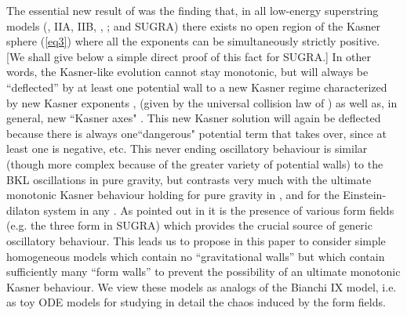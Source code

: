 \documentclass[a4paper,12pt]{article}
\begin{document}
The essential new result of \cite{dh1} was the finding that, in all 
low-energy superstring models (\coordHE{}, IIA, IIB, \coordHE{}, 
\coordHE{}; and \coordHE{} SUGRA) there exists no open region 
of the Kasner sphere (\ref{eq3}) where all the exponents \coordHE{} can be simultaneously strictly positive. 
[We shall give below a simple direct proof of this fact for \coordHE{} 
SUGRA.] In other words, the Kasner-like evolution
cannot stay 
monotonic, but will always be ``deflected'' by at least one 
potential wall to a new Kasner regime characterized by new Kasner
exponents \coordHE{}, \coordHE{} (given by the universal 
collision law of \cite{dh1}) as well as, in general, new
``Kasner axes" \coordHE{}.  This new Kasner solution will
again be deflected because there is always one``dangerous"
potential term that takes over, since at least one \coordHE{} 
is negative, etc.
This never ending oscillatory behaviour is similar (though more 
complex because of the greater variety of potential walls) to the BKL 
oscillations in \coordHE{} pure gravity, but contrasts very much with the 
ultimate monotonic Kasner behaviour holding for pure gravity in \coordHE{} \cite{DHS}, and for the Einstein-dilaton system in any \coordHE{} 
\cite{BK73}. As pointed out in \cite{dh1} it is the presence of 
various form fields (e.g. the three form in \coordHE{} SUGRA) which 
provides the crucial source of generic oscillatory behaviour. This 
leads us to propose in this paper to consider simple homogeneous 
models which contain no ``gravitational walls'' but which contain 
sufficiently many ``form walls'' to prevent the possibility of an 
ultimate monotonic Kasner behaviour. We view these models as analogs 
of the Bianchi IX model, i.e. as toy ODE models for studying in 
detail the chaos induced by the form fields.
\end{document}
